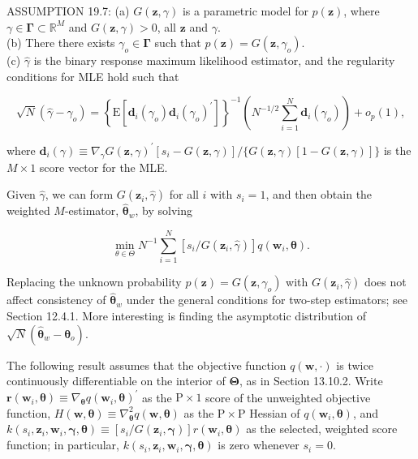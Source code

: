 \documentclass[10pt]{article}
\begin{document}
ASSUMPTION 19.7: (a) $G(\mathbf{z}, \gamma)$ is a parametric model for $p(\mathbf{z})$, where $\gamma \in \boldsymbol{\Gamma} \subset \mathbb{R}^{M}$ and $G(\mathbf{z}, \gamma)>0$, all $\mathbf{z}$ and $\gamma$.\\
(b) There there exists $\gamma_{o} \in \boldsymbol{\Gamma}$ such that $p(\mathbf{z})=G\left(\mathbf{z}, \gamma_{o}\right)$.\\
(c) $\hat{\gamma}$ is the binary response maximum likelihood estimator, and the regularity conditions for MLE hold such that


\begin{equation*}
\sqrt{N}\left(\hat{\gamma}-\gamma_{o}\right)=\left\{\mathrm{E}\left[\mathbf{d}_{i}\left(\gamma_{o}\right) \mathbf{d}_{i}\left(\gamma_{o}\right)^{\prime}\right]\right\}^{-1}\left(N^{-1 / 2} \sum_{i=1}^{N} \mathbf{d}_{i}\left(\gamma_{o}\right)\right)+o_{p}(1), \tag{19.85}
\end{equation*}


where $\mathbf{d}_{i}(\gamma) \equiv \nabla_{\gamma} G(\mathbf{z}, \gamma)^{\prime}\left[s_{i}-G(\mathbf{z}, \gamma)\right] /\{G(\mathbf{z}, \gamma)[1-G(\mathbf{z}, \gamma)]\}$ is the $M \times 1$ score vector for the MLE.

Given $\hat{\gamma}$, we can form $G\left(\mathbf{z}_{i}, \hat{\gamma}\right)$ for all $i$ with $s_{i}=1$, and then obtain the weighted $M$-estimator, $\hat{\boldsymbol{\theta}}_{w}$, by solving


\begin{equation*}
\min _{\theta \in \Theta} N^{-1} \sum_{i=1}^{N}\left[s_{i} / G\left(\mathbf{z}_{i}, \hat{\gamma}\right)\right] q\left(\mathbf{w}_{i}, \boldsymbol{\theta}\right) . \tag{19.86}
\end{equation*}


Replacing the unknown probability $p(\mathbf{z})=G\left(\mathbf{z}, \gamma_{o}\right)$ with $G\left(\mathbf{z}_{i}, \hat{\gamma}\right)$ does not affect consistency of $\hat{\boldsymbol{\theta}}_{w}$ under the general conditions for two-step estimators; see Section 12.4.1. More interesting is finding the asymptotic distribution of $\sqrt{N}\left(\hat{\boldsymbol{\theta}}_{w}-\boldsymbol{\theta}_{o}\right)$.

The following result assumes that the objective function $q(\mathbf{w}, \cdot)$ is twice continuously differentiable on the interior of $\boldsymbol{\Theta}$, as in Section 13.10.2. Write $\mathbf{r}\left(\mathbf{w}_{i}, \boldsymbol{\theta}\right) \equiv \nabla_{\boldsymbol{\theta}} q\left(\mathbf{w}_{i}, \boldsymbol{\theta}\right)^{\prime}$ as the $\mathrm{P} \times 1$ score of the unweighted objective function, $H(\mathbf{w}, \boldsymbol{\theta}) \equiv \nabla_{\boldsymbol{\theta}}^{2} q(\mathbf{w}, \boldsymbol{\theta})$ as the $\mathrm{P} \times \mathrm{P}$ Hessian of $q\left(\mathbf{w}_{i}, \boldsymbol{\theta}\right)$, and $k\left(s_{i}, \mathbf{z}_{i}, \mathbf{w}_{i}, \boldsymbol{\gamma}, \boldsymbol{\theta}\right) \equiv\left[s_{i} / G\left(\mathbf{z}_{i}, \boldsymbol{\gamma}\right)\right] r\left(\mathbf{w}_{i}, \boldsymbol{\theta}\right)$ as the selected, weighted score function; in particular, $k\left(s_{i}, \mathbf{z}_{i}, \mathbf{w}_{i}, \boldsymbol{\gamma}, \boldsymbol{\theta}\right)$ is zero whenever $s_{i}=0$.
\end{document}
